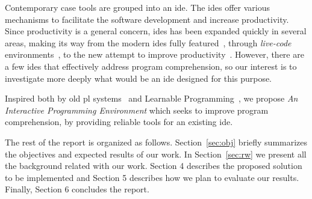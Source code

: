 Contemporary \ac{case} tools are grouped into an \ac{ide}. The \ac{ide}s offer various mechanisms to facilitate the software development and increase productivity. Since productivity is a general concern, \ac{ide}s has been expanded quickly in several areas, making its way from the modern \ac{ide}s fully featured~\cite{carlson2005eclipse,boudreau2002netbeans}, through \textit{live-code} environments~\cite{mclean2010visualisation,sorensen2005impromptu,PER-GRA:2007,GuoSIGCSE2013}, to the new attempt to improve productivity~\cite{lighttable}. However, there are a few \ac{ide}s that effectively address program comprehension, so our interest is to investigate more deeply what would be an \ac{ide} designed for this purpose.

Inspired both by old \ac{pl} systems~\cite{papert1980mindstorms,goldberg1983smalltalk} and Learnable Programming~\cite{learnableProg,inventingPrin}, we propose \textit{An Interactive Programming Environment} which seeks to improve program comprehension, by providing reliable tools for an existing \ac{ide}. 

The rest of the report is organized as follows. Section~\ref{sec:obj} briefly summarizes the objectives and expected results of our work. In Section~\ref{sec:rw} we present all the background related with our work. Section 4 describes the proposed solution to be implemented and Section 5 describes how we plan to evaluate our results. Finally, Section 6 concludes the report.
